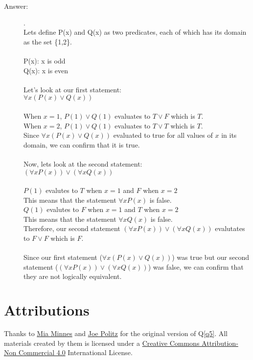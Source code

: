 \documentclass[12pt, oneside]{article}
\begin{document}
\begin{enumerate}
\begin{description}
    \item[Answer:] .\\
    Lets define P(x) and Q(x) as two predicates, each of which has its domain as the set \{1,2\}. \\\\
    P(x): x is odd \\
    Q(x): x is even \\\\
    Let's look at our first statement: \\
    $\forall x (P(x) \lor  Q(x))$ \\\\
    When $x=1$, $P(1) \lor Q(1)$ evaluates to $T \lor F$ which is $T$.\\
    When $x=2$, $P(1) \lor Q(1)$ evaluates to $T \lor T$ which is $T$.\\
    Since $\forall x (P(x) \lor  Q(x))$ evaluated to true for all values of $x$ in its domain, we can confirm that it is true. \\\\
    Now, lets look at the second statement:\\
    $(\forall x P(x)) \lor (\forall x Q(x))$ \\\\
    $P(1)$ evalutes to $T$ when $x=1$ and $F$ when $x=2$\\
    This means that the statement $\forall x P(x)$ is false.\\
    $Q(1)$ evalutes to $F$ when $x=1$ and $T$ when $x=2$\\
    This means that the statement $\forall x Q(x)$ is false.\\
    Therefore, our second statement $(\forall x P(x)) \lor (\forall x Q(x))$ evalutates to $F \lor F$ which is $F$.\\\\
    Since our first statement ($\forall x (P(x) \lor  Q(x))$) was true but our second statement ($(\forall x P(x)) \lor (\forall x Q(x))$) was false, we can confirm that they are not logically equivalent.
\end{description}

\end{enumerate}

\section*{Attributions}

Thanks to \href{http://cseweb.ucsd.edu/~minnes/}{Mia Minnes} and \href{https://jpolitz.github.io/}{Joe Politz} for the original version of Q\ref{q5}. All materials created by them is licensed under a \href{http://creativecommons.org/licenses/by-nc/4.0/}{Creative Commons Attribution-Non Commercial 4.0} International License.
\end{document}
